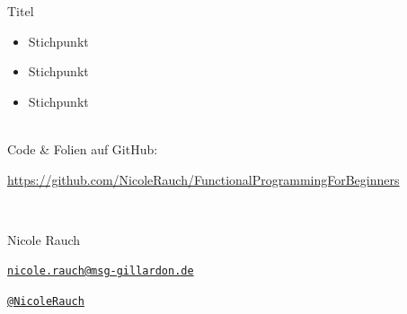\begin{frame}[fragile]{Titel}
\begin{itemize}
\item Stichpunkt
\item Stichpunkt
\item Stichpunkt
\end{itemize}
\end{frame}



{
\begin{frame}{}

        ~\\[4em]
        Code \& Folien auf GitHub:
        \begin{center}
                \url{https://github.com/NicoleRauch/FunctionalProgrammingForBeginners}
        \end{center}

        ~\\[1em]
        \begin{block}{Nicole Rauch}
        \begin{description}[Twitterxx]
                \item[E-Mail]  \href{mailto:nicole.rauch@msg-gillardon.de}{\texttt{nicole.rauch@msg-gillardon.de}}
                \item[Twitter] \href{http://twitter.com/NicoleRauch}{\texttt{@NicoleRauch}}
        \end{description}
        \end{block}
\end{frame}
}
